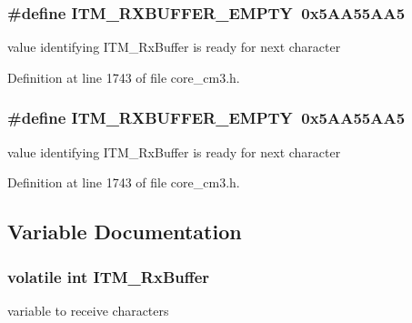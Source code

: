 \subsubsection[{\texorpdfstring{I\+T\+M\+\_\+\+R\+X\+B\+U\+F\+F\+E\+R\+\_\+\+E\+M\+P\+TY}{ITM_RXBUFFER_EMPTY}}]{\setlength{\rightskip}{0pt plus 5cm}\#define I\+T\+M\+\_\+\+R\+X\+B\+U\+F\+F\+E\+R\+\_\+\+E\+M\+P\+TY~0x5\+A\+A55\+A\+A5}\hypertarget{group___c_m_s_i_s___c_m3___core_debug_interface_gaa822cb398ee022b59e9e6c5d7bbb228a}{}\label{group___c_m_s_i_s___c_m3___core_debug_interface_gaa822cb398ee022b59e9e6c5d7bbb228a}
value identifying I\+T\+M\+\_\+\+Rx\+Buffer is ready for next character 

Definition at line 1743 of file core\+\_\+cm3.\+h.

\subsubsection[{\texorpdfstring{I\+T\+M\+\_\+\+R\+X\+B\+U\+F\+F\+E\+R\+\_\+\+E\+M\+P\+TY}{ITM_RXBUFFER_EMPTY}}]{\setlength{\rightskip}{0pt plus 5cm}\#define I\+T\+M\+\_\+\+R\+X\+B\+U\+F\+F\+E\+R\+\_\+\+E\+M\+P\+TY~0x5\+A\+A55\+A\+A5}\hypertarget{group___c_m_s_i_s___c_m3___core_debug_interface_gaa822cb398ee022b59e9e6c5d7bbb228a}{}\label{group___c_m_s_i_s___c_m3___core_debug_interface_gaa822cb398ee022b59e9e6c5d7bbb228a}
value identifying I\+T\+M\+\_\+\+Rx\+Buffer is ready for next character 

Definition at line 1743 of file core\+\_\+cm3.\+h.



\subsection{Variable Documentation}
\subsubsection[{\texorpdfstring{I\+T\+M\+\_\+\+Rx\+Buffer}{ITM_RxBuffer}}]{\setlength{\rightskip}{0pt plus 5cm}volatile int I\+T\+M\+\_\+\+Rx\+Buffer}\hypertarget{group___c_m_s_i_s___c_m3___core_debug_interface_gacf1fe3063cedf11b6e6f7cb0dd7c1a51}{}\label{group___c_m_s_i_s___c_m3___core_debug_interface_gacf1fe3063cedf11b6e6f7cb0dd7c1a51}
variable to receive characters 
